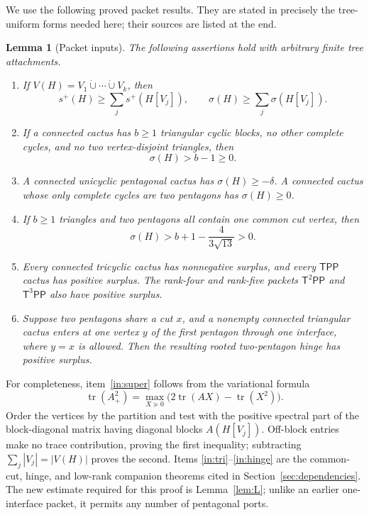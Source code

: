 \documentclass[11pt]{article}
\newtheorem{lemma}[theorem]{Lemma}
\theoremstyle{remark}
\newcommand{\splus}{s^+}
\newcommand{\sig}{\sigma}
\newcommand{\tr}{\operatorname{tr}}
\newcommand{\T}{\mathsf T}
\newcommand{\Pp}{\mathsf P}
\begin{document}
We use the following proved packet results.  They are stated in precisely the
tree-uniform forms needed here; their sources are listed at the end.

\begin{lemma}[Packet inputs]\label{lem:inputs}
The following assertions hold with arbitrary finite tree attachments.
\begin{enumerate}
\item\label{in:super} If $V(H)=V_1\dot\cup\cdots\dot\cup V_k$, then
\[
 \splus(H)\geq\sum_j\splus(H[V_j]),
 \qquad
 \sig(H)\geq\sum_j\sig(H[V_j]).
\]
\item\label{in:tri} If a connected cactus has $b\geq1$ triangular cyclic
blocks, no other complete cycles, and no two vertex-disjoint triangles, then
\[
 \sig(H)>b-1\geq0.
\]
\item\label{in:pents} A connected unicyclic pentagonal cactus has
$\sig(H)\geq-\delta$.  A connected cactus whose only complete cycles are two
pentagons has $\sig(H)\geq0$.
\item\label{in:common} If $b\geq1$ triangles and two pentagons all contain one
common cut vertex, then
\[
 \sig(H)>b+1-\frac4{3\sqrt{13}}>0.
\]
\item\label{in:small} Every connected tricyclic cactus has nonnegative
surplus, and every $\T\Pp\Pp$ cactus has positive surplus.  The rank-four and
rank-five packets $\T^2\Pp\Pp$ and $\T^3\Pp\Pp$ also have positive surplus.
\item\label{in:hinge} Suppose two pentagons share a cut $x$, and a nonempty
connected triangular cactus enters at one vertex $y$ of the first pentagon
through one interface, where $y=x$ is allowed.  Then the resulting rooted
two-pentagon hinge has positive surplus.
\end{enumerate}
\end{lemma}

For completeness, item~\ref{in:super} follows from the variational formula
\[
 \tr(A_+^2)=\max_{X\succeq0}
 \bigl(2\tr(AX)-\tr(X^2)\bigr).
\]
Order the vertices by the partition and test with the positive spectral part
of the block-diagonal matrix having diagonal blocks $A(H[V_j])$.  Off-block
entries make no trace contribution, proving the first inequality; subtracting
$\sum_j|V_j|=|V(H)|$ proves the second.  Items
\ref{in:tri}--\ref{in:hinge} are the common-cut, hinge, and low-rank companion
theorems cited in Section~\ref{sec:dependencies}.  The new estimate required
for this proof is Lemma~\ref{lem:L}; unlike an earlier one-interface packet,
it permits any number of pentagonal ports.
\end{document}
